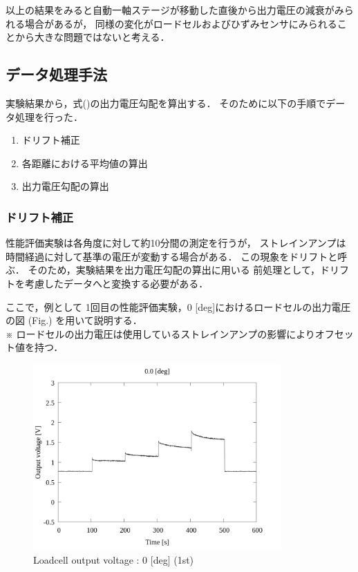 以上の結果をみると自動一軸ステージが移動した直後から出力電圧の減衰がみられる場合があるが，
同様の変化がロードセルおよびひずみセンサにみられることから大きな問題ではないと考える．

\newpage

\subsection{データ処理手法}

実験結果から，式()の出力電圧勾配を算出する．
そのために以下の手順でデータ処理を行った．

\begin{enumerate}[(1)]
    \item ドリフト補正
    \item 各距離における平均値の算出
    \item 出力電圧勾配の算出
\end{enumerate}

\subsubsection{ドリフト補正}
性能評価実験は各角度に対して約10分間の測定を行うが，
ストレインアンプは時間経過に対して基準の電圧が変動する場合がある．
この現象をドリフトと呼ぶ．
そのため，実験結果を出力電圧勾配の算出に用いる
前処理として，ドリフトを考慮したデータへと変換する必要がある．

ここで，例として 1回目の性能評価実験，0 [deg]におけるロードセルの出力電圧の図 (Fig.) を用いて説明する．\\
※ ロードセルの出力電圧は使用しているストレインアンプの影響によりオフセット値を持つ．

\begin{figure}[htbp]
    \footnotesize
    \begin{center}
        \includegraphics[width=95mm]{../../02_workspace/result/2-1/plot/01-1_loadcell/01_loadcell_0.png}
        \caption{Loadcell output voltage : 0 [deg] (1st)}
    \end{center}
\end{figure}

